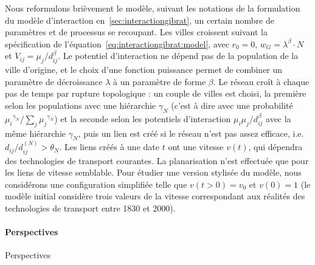 Nous reformulons brièvement le modèle, suivant les notations de la formulation du modèle d'interaction en~\ref{sec:interactiongibrat}, un certain nombre de paramètres et de processus se recoupant. Les villes croissent suivant la spécification de l'équation~\ref{eq:interactiongibrat:model}, avec $r_0 = 0$, $w_G = \lambda^\beta \cdot N$ et $V_{ij} = \mu_j / d_{ij}^\beta$. Le potentiel d'interaction ne dépend pas de la population de la ville d'origine, et le choix d'une fonction puissance permet de combiner un paramètre de décroissance $\lambda$ à un paramètre de forme $\beta$. Le réseau croît à chaque pas de temps par rupture topologique : un couple de villes est choisi, la première selon les populations avec une hiérarchie $\gamma_N$ (c'est à dire avec une probabilité ${\mu_i}^{\gamma_N} / \sum_j {\mu_j}^{\gamma_N}$)\comment[FL]{estce vraiment necessaire d'utiliser des eq [our dire qu'une proba est proportionelle a la part de $\mu_i^{\gamma_N}$} et la seconde selon les potentiels d'interaction $\mu_i \mu_j / d_{ij}^\beta$ avec la même hiérarchie $\gamma_N$, puis un lien est créé si le réseau n'est pas assez efficace, i.e. $d_{ij}/d^{(N)}_{ij}> \theta_N$. Les liens créés à une date $t$ ont une vitesse $v(t)$, qui dépendra des technologies de transport courantes. La planarisation n'est effectuée que pour les liens de vitesse semblable. Pour étudier une version stylisée du modèle, nous considérons une configuration simplifiée telle que $v(t > 0) = v_0$ et $v(0) = 1$ (le modèle initial considère trois valeurs de la vitesse correspondant aux réalités des technologies de transport entre 1830 et 2000).



\paragraph{Perspectives}{Perspectives}

